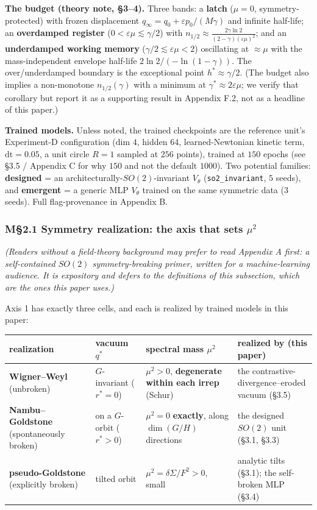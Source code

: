 \documentclass[10pt]{article}
\begin{document}
\textbf{The budget (theory note, \S3--4).} Three bands: a \textbf{latch} ($\mu=0$, symmetry-protected) with frozen displacement $q_\infty=q_0+\varepsilon p_0/(M\gamma)$ and infinite half-life; an \textbf{overdamped register} ($0<\varepsilon\mu\lesssim\gamma/2$) with $n_{1/2}\approx\tfrac{2\gamma\ln2}{(2-\gamma)(\varepsilon\mu)^2}$; and an \textbf{underdamped working memory} ($\gamma/2\lesssim\varepsilon\mu<2$) oscillating at $\approx\mu$ with the mass-independent envelope half-life $2\ln2/(-\ln(1-\gamma))$. The over/underdamped boundary is the exceptional point $h^*\approx\gamma/2$. (The budget also implies a non-monotone $n_{1/2}(\gamma)$ with a minimum at $\gamma^*\approx2\varepsilon\mu$; we verify that corollary but report it as a supporting result in Appendix F.2, not as a headline of this paper.)

\textbf{Trained models.} Unless noted, the trained checkpoints are the reference unit's Experiment-D configuration (dim $4$, hidden $64$, learned-Newtonian kinetic term, $\mathrm{dt}=0.05$, a unit circle $R=1$ sampled at $256$ points), trained at $150$ epochs (see \S3.5 / Appendix C for why $150$ and not the default $1000$). Two potential families: \textbf{designed} = an architecturally-$SO(2)$-invariant $V_\theta$ (\texttt{so2\_invariant}, $5$ seeds), and \textbf{emergent} = a generic MLP $V_\theta$ trained on the same symmetric data ($3$ seeds). Full flag-provenance in Appendix B.

\subsubsection*{M\S2.1 Symmetry realization: the axis that sets $\mu^2$}

\emph{(Readers without a field-theory background may prefer to read Appendix A first: a self-contained $SO(2)$ symmetry-breaking primer, written for a machine-learning audience. It is expository and defers to the definitions of this subsection, which are the ones this paper uses.)}

Axis 1 has exactly three cells, and each is realized by trained models in this paper:

\begin{center}\small
\begin{tabular}{@{}p{1.55in} p{1.15in} p{1.85in} p{1.5in}@{}}
\toprule
realization & vacuum $q^*$ & spectral mass $\mu^2$ & realized by (this paper) \\
\midrule
\textbf{Wigner--Weyl} (unbroken) & $G$-invariant ($r^*=0$) & $\mu^2>0$, \textbf{degenerate within each irrep} (Schur) & the contrastive-divergence--eroded vacuum (\S3.5) \\
\textbf{Nambu--Goldstone} (spontaneously broken) & on a $G$-orbit ($r^*>0$) & $\mu^2=0$ \textbf{exactly}, along $\dim(G/H)$ directions & the designed $SO(2)$ unit (\S3.1, \S3.3) \\
\textbf{pseudo-Goldstone} (explicitly broken) & tilted orbit & $\mu^2=\delta\Sigma/F^2>0$, small & analytic tilts (\S3.1); the self-broken MLP (\S3.4) \\
\bottomrule
\end{tabular}
\end{center}
\end{document}
